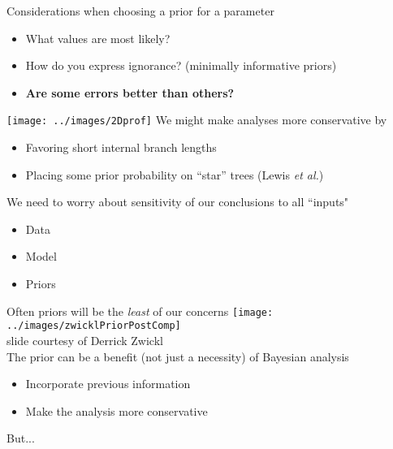 \documentclass{seminar}
\begin{document}
\begin{slide}
\newslide
\Large	Considerations when choosing a prior for a parameter
\begin{itemize}
	\item What values are most likely?
	\item How do you express ignorance? (minimally informative priors)
	\item {\bf Are some errors better than others?	}
\end{itemize}
\newslide
{\texttt{[image: ../images/2Dprof]}}
\newslide
{}
\newslide
\Large We might make analyses more conservative by 
\begin{itemize}
	\item Favoring short internal branch lengths
	\item Placing some prior probability on ``star'' trees (Lewis {\em et al.})
\end{itemize}
\newslide
	\Large We need to worry about sensitivity of our conclusions to all ``inputs"
\begin{itemize}
	\item Data
	\item Model
	\item Priors
\end{itemize}
Often priors will be the {\em least} of our concerns
\newslide
\texttt{[image: ../images/zwicklPriorPostComp]}\\
\tiny slide courtesy of Derrick Zwickl\\
\newslide
	\Large The prior can be a benefit (not just a necessity) of Bayesian analysis
\begin{itemize}
	\item Incorporate previous information
	\item Make the analysis more conservative\\[20pt]
\end{itemize}
But...
\newslide


\end{slide}
\end{document}
